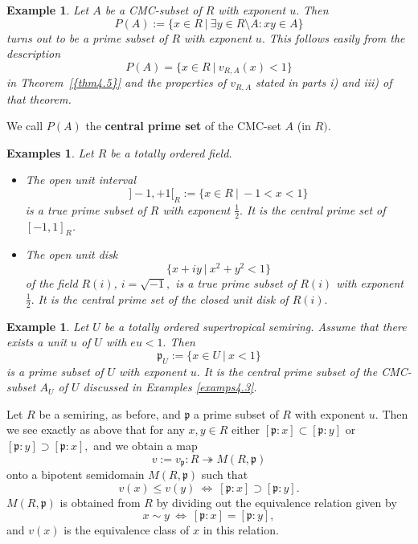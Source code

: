 \documentclass [12pt,a4paper,reqno]{amsart}
\newtheorem{example}[thm]{Example}
\newtheorem{examp}[thm]{Example}
\newtheorem{examples}[thm]{Examples}
\begin{document}
\begin{examp}\label{examp4.7}
Let $A$ be a CMC-subset of $R $ with exponent $u.$ Then
$$P(A):=\{x\in R {\ {|} \ }  \exists y\in R\setminus A:xy\in A\}$$
turns out to be a prime subset of $R$ with exponent $u.$ This
follows easily from the description
$$P(A)=\{x\in R {\ {|} \ }  v_{R,A}(x)<1\}$$
in {Theorem~\ref{{thm4.5}}} and the properties of $v_{R,A}$ stated in parts
i) and iii) of that theorem.\end{examp}

We call $P(A)$ the {\textbf{{central prime set}}} of the CMC-set $A$ (in
$R).$

\begin{examples}\label{examps4.8}
Let $R$ be a totally ordered field.
\begin{itemize}
    \item[a)] The open unit interval
$$]-1,+1[_R:=\{x\in R {\ {|} \ }-1<x<1\}$$
is a true prime subset of $R$ with exponent $\frac{1}{2}.$ It is
the central prime set of $[-1,1]_R$.

\item[b)] The open unit disk
$$\{x+iy {\ {|} \ }x^2+y^2<1\}$$
of the field $R(i)$, $i=\sqrt{-1},$ is a true prime subset of
$R(i)$ with exponent $\frac{1}{2}.$ It is the central prime set of
the closed unit disk of $R(i).$
\end{itemize}
\end{examples}

\begin{example}\label{examp4.9}
Let $U$ be a totally ordered supertropical semiring. Assume that
there exists a unit $u$ of $U$ with $eu<1.$ Then
$${\mathfrak p}_U:=\{x\in U {\ {|} \ }x<1\}$$ is a prime subset of $U$ with
exponent $u.$ It is the central prime subset of the CMC-subset
$A_U$ of $U$ discussed in Examples \ref{examps4.3}.
\end{example}

Let $R$ be a semiring, as before, and ${\mathfrak p}$ a prime subset of $R$
with exponent $u.$ Then we see exactly as above that for any
$x,y\in R$ either $[{\mathfrak p}:x]\subset[{\mathfrak p}:y]$ or
$[{\mathfrak p}:y]\supset[{\mathfrak p}:x],$ and we obtain a map
$$v:=v_{\mathfrak p}:R\twoheadrightarrow M(R,{\mathfrak p})$$
onto a bipotent semidomain $M(R,{\mathfrak p})$ such that
$$v(x)\le v(y) {\ {\Leftrightarrow} \ } [{\mathfrak p}:x]\supset[{\mathfrak p}:y].$$ $M(R,{\mathfrak p})$ is obtained from $R$ by dividing out the
equivalence relation given by
$$x\sim y {\ {\Leftrightarrow} \ } [{\mathfrak p}:x]=[{\mathfrak p}:y],$$ and
$v(x)$ is the equivalence class of $x$ in this relation.
\end{document}
